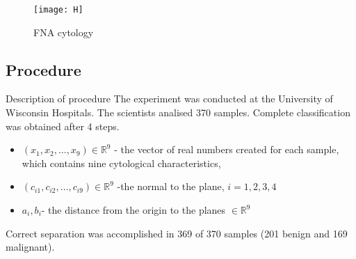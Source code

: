 \documentclass{beamer}
\begin{document}

\begin{figure}[h]

	\caption{\textit{William H. Wolberg, Olvi L. Mangasarian: Multisurface method of pattern separation for medical diagnosis applied to breast cytology }\cite{msm} }
	\centering
	\texttt{[image: H]}
	\caption{FNA cytology}
	
\end{figure}




\subsection{Procedure}
\begin{frame}[allowframebreaks]{Description of procedure}
The experiment was conducted at the University of Wisconsin Hospitals. The scientists analised 370 samples. Complete classification was obtained after 4 steps.
\begin{block}

\begin{itemize}
\item $(x_1,x_2, \ldots, x_9) \in \mathbb{R}^9$ - the vector of real numbers created for each sample, which contains nine cytological characteristics,
\item  $(c_{i1},c_{i2}, \ldots, c_{i9}) \in \mathbb{R}^9$ -the normal to the plane, $i=1,2,3,4$
\item $a_i,b_i$- the distance from the origin to the planes  $\in \mathbb{R}^9$
\end{itemize}

\end{block}
Correct separation was accomplished in 369 of 370 samples (201 benign
and 169 malignant).








\end{frame}
\end{document}
